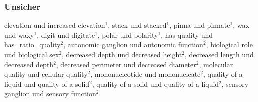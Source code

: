 \subsubsection{Unsicher}
elevation und increased elevation$^1$, stack und stacked$^1$, pinna und pinnate$^1$, wax und
waxy$^1$, digit und digitate$^1$, polar und polarity$^1$, has quality und
has_ratio_quality$^2$, autonomic ganglion und autonomic function$^2$, biological
role und biological sex$^2$, decreased depth und decreased height$^2$, decreased
length und decreased depth$^2$, decreased perimeter und decreased diameter$^2$,
molecular quality und cellular quality$^2$, mononucleotide und mononucleate$^2$,
quality of a liquid und quality of a solid$^2$, quality of a solid und quality of a
liquid$^2$, sensory ganglion und sensory function$^2$
